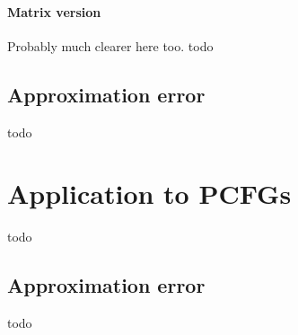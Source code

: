 \documentclass{article}
\begin{document}
\paragraph{Matrix version}
Probably much clearer here too.
todo

\subsection{Approximation error}
todo

\section{Application to PCFGs}
todo

\subsection{Approximation error}
todo



\end{document}
